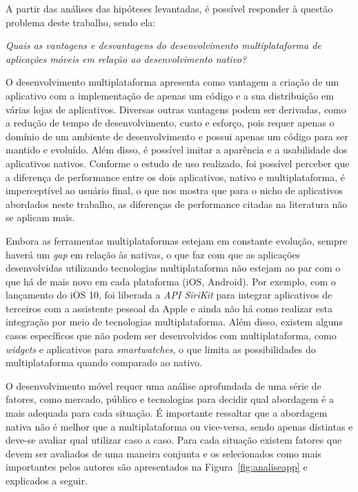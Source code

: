 A partir das análises das hipóteses levantadas, é possível responder à questão problema deste trabalho, sendo ela:
\begin{center}
    \textit{Quais as vantagens e desvantagens do desenvolvimento multiplataforma de aplicações móveis em relação ao desenvolvimento nativo?}
\end{center}

O desenvolvimento multiplataforma apresenta como vantagem a criação de um aplicativo com a implementação de apenas um código e a sua distribuição em várias lojas de aplicativos. Diversas outras vantagens podem ser 
derivadas, como a redução de tempo de desenvolvimento, custo e esforço, pois requer apenas o domínio de um ambiente de desenvolvimento e possui apenas um código para ser mantido e evoluído. Além disso, é possível imitar 
a aparência e a usabilidade dos aplicativos nativos. Conforme o estudo de uso realizado, foi possível perceber que a diferença de performance entre os dois aplicativos, nativo e multiplataforma, é imperceptível ao usuário 
final, o que nos mostra que para o nicho de aplicativos abordados neste trabalho, as diferenças de performance citadas na literatura não se aplicam mais.

Embora as ferramentas multiplataformas estejam em constante evolução, sempre haverá um \textit{gap} em relação às nativas, o que faz com que as aplicações desenvolvidas utilizando tecnologias multiplataforma não estejam 
ao par com o que há de mais novo em cada plataforma (iOS, Android). Por exemplo, com o lançamento do iOS 10, foi liberada a \textit{API SiriKit} para integrar aplicativos de terceiros com a assistente pessoal da Apple e 
ainda não há como realizar esta integração por meio de tecnologias multiplataforma. Além disso, existem alguns casos específicos que não podem ser desenvolvidos com multiplataforma, como \textit{widgets} e aplicativos para 
\textit{smartwatches}, o que limita as possibilidades do multiplataforma quando comparado ao nativo.

O desenvolvimento móvel requer uma análise aprofundada de uma série de fatores, como mercado, público e tecnologias para decidir qual abordagem é a mais adequada para cada situação.
É importante ressaltar que a abordagem nativa não é melhor que a multiplataforma ou vice-versa, sendo apenas distintas e deve-se avaliar qual utilizar caso a 
caso. Para cada situação existem fatores que devem ser avaliados de uma maneira conjunta e os selecionados como mais importantes pelos autores são apresentados na Figura~\ref{fig:analiseapp} e explicados a seguir.

